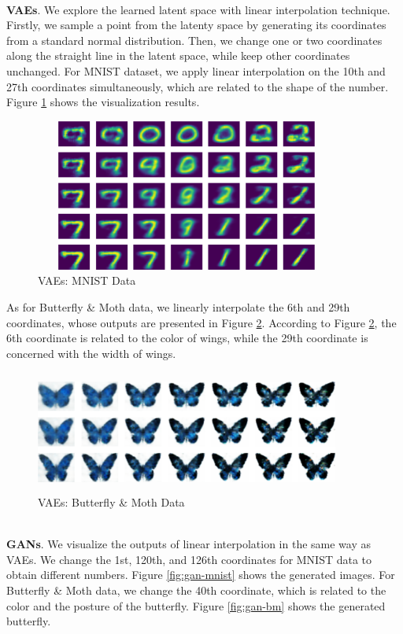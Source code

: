 \documentclass{article}
\begin{document}
\par~\\
\textbf{VAEs}. We explore the learned latent space with linear interpolation technique. Firstly, we sample a point from the latenty space by generating its coordinates from a standard normal distribution. Then, we change one or two coordinates along the straight line in the latent space, while keep other coordinates unchanged. For MNIST dataset, we apply linear interpolation on the 10th and 27th coordinates simultaneously, which are related to the shape of the number. Figure \ref{fig:vae-mnist} shows the visualization results.
\begin{figure}[!ht]
    \centering
    \includegraphics[width=10cm, height=5cm]{./fig/mnist-vae.png}
    \caption{VAEs: MNIST Data}
    \label{fig:vae-mnist}
\end{figure}
As for Butterfly \& Moth data, we linearly interpolate the 6th and 29th coordinates, whose outputs are presented in Figure \ref{fig:vae-bm}. According to Figure \ref{fig:vae-bm}, the 6th coordinate is related to the color of wings, while the 29th coordinate is concerned with the width of wings.
\begin{figure}[!ht]
    \centering
    \includegraphics[width=10cm, height=4cm]{./fig/bm-vae.png}
    \caption{VAEs: Butterfly \& Moth Data}
    \label{fig:vae-bm}
\end{figure}
\par~\\
\textbf{GANs}. We visualize the outputs of linear interpolation in the same way as VAEs. We change the 1st, 120th, and 126th coordinates for MNIST data to obtain different numbers. Figure \ref{fig:gan-mnist} shows the generated images. For Butterfly \& Moth data, we change the 40th coordinate, which is related to the color and the posture of the butterfly. Figure \ref{fig:gan-bm} shows the generated butterfly.
\end{document}
